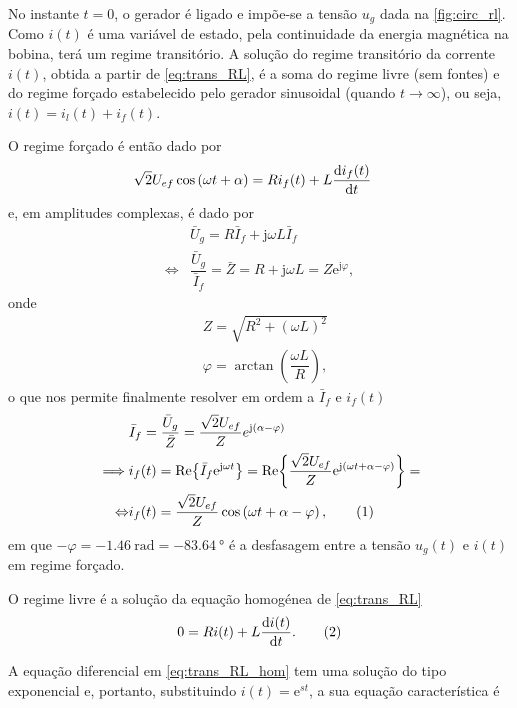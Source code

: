 \documentclass[a4paper, titlepage, portuguese]{article}
\newcommand{\eq}{\Leftrightarrow} %
\newcommand\numberthis{\addtocounter{equation}{1}\tag{\theequation}}
\newcommand\e{\mathrm{e} }
\newcommand\jj{\mathrm{j} }
\begin{document}
		\par
		No instante $t = 0$, o gerador é ligado e impõe-se a tensão $u_{g}$ dada na \autoref{fig:circ_rl}. Como $i(t)$ é uma variável de estado, pela continuidade da energia magnética na bobina, terá um regime transitório. A solução do regime transitório da corrente $i(t)$, obtida a partir de \eqref{eq:trans_RL}, é a soma do regime livre (sem fontes) e do regime forçado estabelecido pelo gerador sinusoidal (quando $t \to \infty$), ou seja, $i(t) = i_l(t) + i_f(t)$. \\
		\par
		O regime forçado é então dado por
		\begin{align*}
			&\sqrt{2}U_{ef}\cos\left(\omega t + \alpha\right) = Ri_f(t) + L \dv{i_f(t)}{t}
		\end{align*}
		e, em amplitudes complexas, é dado por
		\begin{align*}
			&\bar{U}_g = R\bar{I}_f + \jj \omega L\bar{I}_f \\ \eq
			&\dfrac{\bar{U}_g}{\bar{I}_f} = \bar{Z} = R + \jj \omega L = Z\e^{\jj\varphi},
		\end{align*}
		onde
		\begin{align*}
			&Z = \sqrt{R^2 + (\omega L)^2} \\
			&\varphi = \arctan\left(\dfrac{\omega L}{R}\right),
		\end{align*}
		o que nos permite finalmente resolver em ordem a $\bar{I}_f$ e $i_f(t)$
		\begin{align*}
			&\bar{I}_f = \dfrac{\bar{U}_g}{\bar{Z}} = \dfrac{\sqrt{2}U_{ef}}{Z} e^{\jj\left(\alpha - \varphi\right)} \\ \implies
			&i_f(t) = \Re{\bar{I}_f \e^{\jj \omega t}} = \Re{\dfrac{\sqrt{2}U_{ef}}{Z} \e^{\jj\left(\omega t + \alpha - \varphi\right)}} = \\ \eq
			&i_f(t) = \dfrac{\sqrt{2}U_{ef}}{Z} \cos\left(\omega t + \alpha - \varphi\right), \numberthis \label{eq:trans_RL_forc}
		\end{align*}
		em que $- \varphi = \SI{-1.46}{\radian} = \SI{-83.64}{\degree}$ é a desfasagem entre a tensão $u_g(t)$ e $i(t)$ em regime forçado.\\
		\par
		O regime livre é a solução da equação homogénea de \eqref{eq:trans_RL}
		\begin{align*}
			0 = R i(t) + L \dv{i(t)}{t}. \numberthis \label{eq:trans_RL_hom}
		\end{align*}
		\par
		A equação diferencial em \eqref{eq:trans_RL_hom} tem uma solução do tipo exponencial e, portanto, substituindo $i(t) = \e^{st}$, a sua equação característica é
\end{document}
